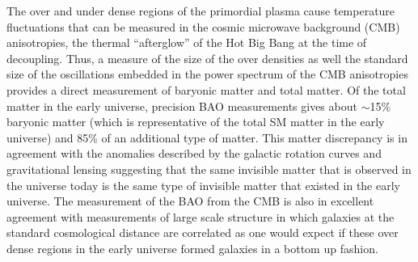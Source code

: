The over and under dense regions of the primordial plasma cause temperature fluctuations that can be measured in the cosmic microwave background (CMB) anisotropies, the thermal ``afterglow'' of the Hot Big Bang at the time of decoupling. Thus, a measure of the size of the over densities as well the standard size of the oscillations embedded in the power spectrum of the CMB anisotropies provides a direct measurement of baryonic matter and total matter. %
Of the total matter in the early universe, precision BAO measurements gives about $\sim$15\% baryonic matter (which is representative of the total SM matter in the early universe) and 85\% of an additional type of matter. This matter discrepancy is in agreement with the anomalies described by the galactic rotation curves and gravitational lensing suggesting that the same invisible matter that is observed in the universe today is the same type of invisible matter that existed in the early universe. The measurement of the BAO from the CMB is also in excellent agreement with measurements of large scale structure in which galaxies at the standard cosmological distance are correlated as one would expect if these over dense regions in the early universe formed galaxies in a bottom up fashion.


